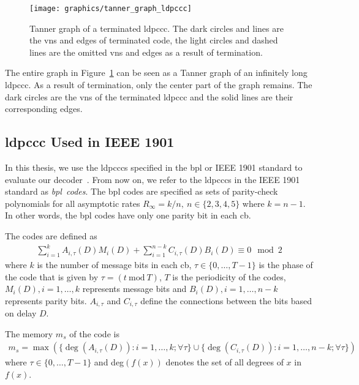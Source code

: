 \begin{figure}[htbp]
  \centering
  \texttt{[image: graphics/tanner\_graph\_ldpccc]}
  \caption{Tanner graph of a terminated \gls{ldpccc}. The dark circles and lines are the \glspl{vn} and edges of terminated code, the light circles and dashed lines are the omitted \glspl{vn} and edges as a result of termination.}
  \label{fig:tannGraphLdpccc}
\end{figure}

The entire graph in Figure~\ref{fig:tannGraphLdpccc} can be seen as a Tanner graph of an infinitely long \gls{ldpccc}. As a result of termination, only the center part of the graph remains. The dark circles are the \glspl{vn} of the terminated \gls{ldpccc} and the solid lines are their corresponding edges.

\subsection{\acrlong{ldpccc} Used in IEEE 1901}\label{sec:bpl_bg}
In this thesis, we use the \glspl{ldpccc} specified in the \gls{bpl} or IEEE 1901 standard to evaluate our decoder~\cite{Bpl}. From now on, we refer to the \glspl{ldpccc} in the IEEE 1901 standard as \emph{\gls{bpl}~codes}. The \gls{bpl} codes are specified as sets of parity-check polynomials for all asymptotic rates $R_\infty=k/n,\ n\in\{2,3,4,5\}$ where $k=n-1$. In other words, the \gls{bpl} codes have only one parity bit in each \gls{cb}. 

The codes are defined as
\begin{align}\label{eq:bpl_poly}
\sum_{i=1}^{k}A_{i,\tau}(D)M_i(D)+\sum_{i=1}^{n-k}C_{i,\tau}(D)B_i(D)\equiv 0\mod 2
\end{align}
where $k$ is the number of message bits in each \gls{cb}, $\tau \in \{0,\dots,T-1\}$ is the phase of the code that is given by $\tau=(t\ \text{mod}\ T)$, $T$ is the periodicity of the codes, $M_i(D),i=1,\dots,k$ represents message bits and $B_i(D),i=1,\dots,n-k$ represents parity bits. $A_{i,\tau}$ and $C_{i,\tau}$ define the connections between the bits based on delay $D$.

The memory $m_s$ of the code is
\begin{align}
m_s=\max\left(\{\deg(A_{i,\tau}(D)):i=1,\dots,k;\forall\tau\}\cup\{\deg(C_{i,\tau}(D)):i=1,\dots,n-k;\forall\tau\}\right)
\end{align}
where $\tau \in \{0,\dots,T-1\}$ and deg$(f(x))$ denotes the set of all degrees of $x$ in $f(x)$.

